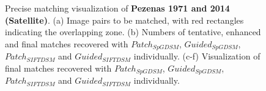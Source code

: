 \begin{figure}[htbp]
\begin{center}
{\begin{minipage}[t]{0.48\linewidth}
			\end{minipage}%
		}
		\caption{Precise matching visualization of \textbf{Pezenas 1971 and 2014 (Satellite)}. (a) Image pairs to be matched, with red rectangles indicating the overlapping zone. (b) Numbers of tentative, enhanced and final matches recovered with $Patch_{SpGDSM}$, $Guided_{SpGDSM}$, $Patch_{SIFTDSM}$ and $Guided_{SIFTDSM}$ individually. (c-f) Visualization of final matches recovered with $Patch_{SpGDSM}$, $Guided_{SpGDSM}$, $Patch_{SIFTDSM}$ and $Guided_{SIFTDSM}$ individually.}
		\label{MatchVizPezenas}
	\end{center}
\end{figure} 


